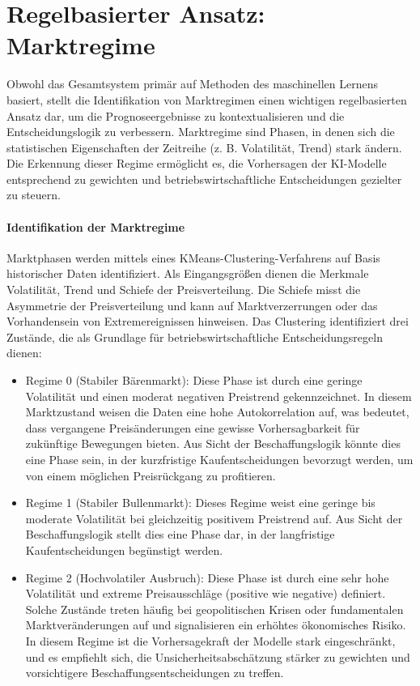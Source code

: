 \section{Regelbasierter Ansatz: Marktregime}
\label{sec:regelbasiert}

Obwohl das Gesamtsystem primär auf Methoden des maschinellen Lernens basiert, stellt die Identifikation von Marktregimen einen wichtigen regelbasierten Ansatz dar, um die Prognoseergebnisse zu kontextualisieren und die Entscheidungslogik zu verbessern. Marktregime sind Phasen, in denen sich die statistischen Eigenschaften der Zeitreihe (z. B. Volatilität, Trend) stark ändern. Die Erkennung dieser Regime ermöglicht es, die Vorhersagen der KI-Modelle entsprechend zu gewichten und betriebswirtschaftliche Entscheidungen gezielter zu steuern.

\paragraph{Identifikation der Marktregime}
Marktphasen werden mittels eines KMeans-Clustering-Verfahrens auf Basis historischer Daten identifiziert. Als Eingangsgrößen dienen die Merkmale Volatilität, Trend und Schiefe der Preisverteilung. Die Schiefe misst die Asymmetrie der Preisverteilung und kann auf Marktverzerrungen oder das Vorhandensein von Extremereignissen hinweisen. Das Clustering identifiziert drei Zustände, die als Grundlage für betriebswirtschaftliche Entscheidungsregeln dienen:

\begin{itemize}
    \item Regime 0 (Stabiler Bärenmarkt): Diese Phase ist durch eine geringe Volatilität und einen moderat negativen Preistrend gekennzeichnet. In diesem Marktzustand weisen die Daten eine hohe Autokorrelation auf, was bedeutet, dass vergangene Preisänderungen eine gewisse Vorhersagbarkeit für zukünftige Bewegungen bieten. Aus Sicht der Beschaffungslogik könnte dies eine Phase sein, in der kurzfristige Kaufentscheidungen bevorzugt werden, um von einem möglichen Preisrückgang zu profitieren.
    \item Regime 1 (Stabiler Bullenmarkt): Dieses Regime weist eine geringe bis moderate Volatilität bei gleichzeitig positivem Preistrend auf. Aus Sicht der Beschaffungslogik stellt dies eine Phase dar, in der langfristige Kaufentscheidungen begünstigt werden.
    \item Regime 2 (Hochvolatiler Ausbruch): Diese Phase ist durch eine sehr hohe Volatilität und extreme Preisausschläge (positive wie negative) definiert. Solche Zustände treten häufig bei geopolitischen Krisen oder fundamentalen Marktveränderungen auf und signalisieren ein erhöhtes ökonomisches Risiko. In diesem Regime ist die Vorhersagekraft der Modelle stark eingeschränkt, und es empfiehlt sich, die Unsicherheitsabschätzung stärker zu gewichten und vorsichtigere Beschaffungsentscheidungen zu treffen.
\end{itemize}

